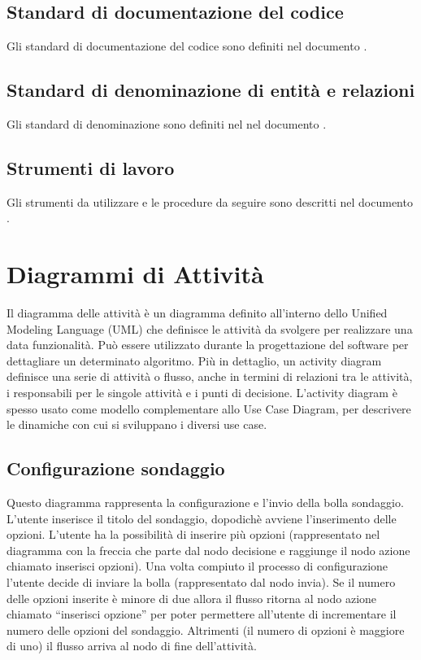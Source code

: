 \subsection{Standard di documentazione del codice}
Gli standard di documentazione del codice sono definiti nel
documento  \emph{\normediprogetto} .

\subsection{Standard di denominazione di entità e relazioni }
Gli standard di denominazione sono definiti nel nel
documento  \emph{\normediprogetto} .

\subsection{Strumenti di lavoro}
Gli strumenti da utilizzare e le procedure da seguire sono descritti
nel documento  \emph{\normediprogetto} .


\section{Diagrammi di Attività}
Il diagramma delle attività è un diagramma definito all'interno dello
Unified Modeling Language (UML) che definisce le attività da svolgere
per realizzare una data funzionalità. Può essere utilizzato durante la
progettazione del software per dettagliare un determinato
algoritmo. Più in dettaglio, un activity diagram definisce una serie
di attività o flusso, anche in termini di relazioni tra le attività, i
responsabili per le singole attività e i punti di
decisione. L'activity diagram è spesso usato come modello
complementare allo Use Case Diagram, per descrivere le dinamiche con
cui si sviluppano i diversi use case. 

\subsection{Configurazione sondaggio}
Questo diagramma rappresenta la configurazione e l'invio della bolla
sondaggio. L’utente inserisce il titolo del sondaggio, dopodichè
avviene l’inserimento delle opzioni. L’utente ha la possibilità di
inserire più opzioni (rappresentato nel diagramma con la freccia che
parte dal nodo decisione e raggiunge il nodo azione chiamato inserisci
opzioni). Una volta compiuto il processo di configurazione l’utente
decide di inviare la bolla (rappresentato dal nodo invia). Se il
numero delle opzioni inserite è minore di due allora il flusso ritorna
al nodo azione chiamato “inserisci opzione” per poter permettere
all’utente di incrementare il numero delle opzioni del
sondaggio. Altrimenti (il numero di opzioni è maggiore di uno) il
flusso arriva al nodo di fine dell’attività. 

